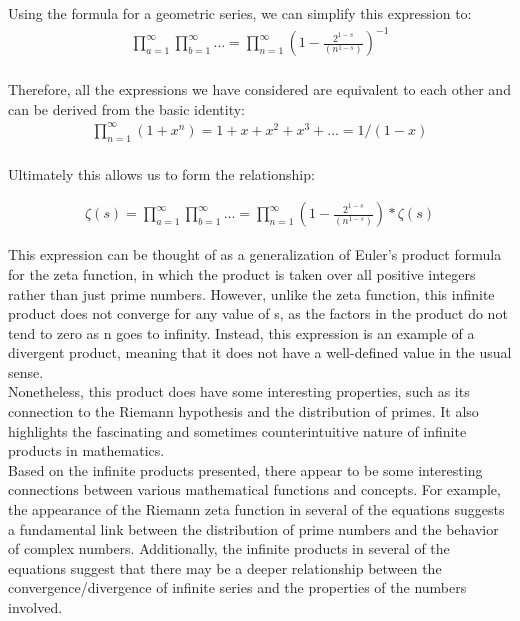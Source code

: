 \documentclass{article}
\begin{document}
Using the formula for a geometric series, we can simplify this expression to: \\

\begin{align*}
\prod_{a=1}^\infty \prod_{b=1}^\infty ... = \prod_{n=1}^\infty \left(1 - \frac{2^{1-s}}{\left(n^{1-s}\right)}\right)^{-1} \\
\end{align*}

Therefore, all the expressions we have considered are equivalent to each other and can be derived from the basic identity: \\

\begin{align*}
\prod_{n=1}^\infty \left(1 + x^{n}\right) = 1 + x + x^{2} + x^{3} + ... = 1/\left(1 - x\right) \\
\end{align*}

Ultimately this allows us to form the relationship:

\begin{align*}
\zeta(s) = \prod_{a=1}^\infty \prod_{b=1}^\infty ... = \prod_{n=1}^\infty \left(1 - \frac{2^{1-s}}{\left(n^{1-s}\right)}\right) * \zeta(s)
\end{align*}

This expression can be thought of as a generalization of Euler's product formula for the zeta function, in which the product is taken over all positive integers rather than just prime numbers. However, unlike the zeta function, this infinite product does not converge for any value of s, as the factors in the product do not tend to zero as n goes to infinity. Instead, this expression is an example of a divergent product, meaning that it does not have a well-defined value in the usual sense. \\

Nonetheless, this product does have some interesting properties, such as its connection to the Riemann hypothesis and the distribution of primes. It also highlights the fascinating and sometimes counterintuitive nature of infinite products in mathematics. \\

Based on the infinite products presented, there appear to be some interesting connections between various mathematical functions and concepts. For example, the appearance of the Riemann zeta function in several of the equations suggests a fundamental link between the distribution of prime numbers and the behavior of complex numbers. Additionally, the infinite products in several of the equations suggest that there may be a deeper relationship between the convergence/divergence of infinite series and the properties of the numbers involved. \\
\end{document}
